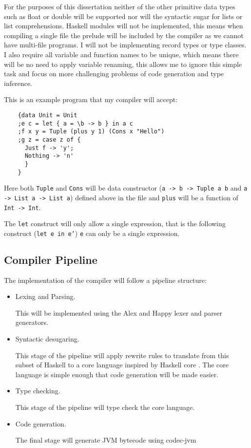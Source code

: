 \documentclass[12pt,a4paper,twoside]{article}
\begin{document}
  For the purposes of this dissertation neither of the other primitive data types such as float or double will be supported nor will the syntactic sugar for lists
  or list comprehensions.
  Haskell modules will not be implemented, this means when compiling a single file the prelude will be included by the compiler as we cannot have multi-file programs.
  I will not be implementing record types or type classes. I also require all variable and function names to be unique, which means there will be no need to apply
  variable renaming, this allows me to ignore this simple task and focus on more challenging problems of code generation and type inference.

  This is an example program that my compiler will accept:

  \begin{verbatim}
    {data Unit = Unit
    ;e c = let { a = \b -> b } in a c
    ;f x y = Tuple (plus y 1) (Cons x "Hello")
    ;g z = case z of {
      Just f -> 'y';
      Nothing -> 'n'
      }
    }
  \end{verbatim}

  Here both \texttt{Tuple} and \texttt{Cons} will be data constructor (\texttt{a -> b -> Tuple a b} and \texttt{a -> List a -> List a})
  defined above in the file and \texttt{plus} will be a function of \texttt{Int -> Int}.

  The \texttt{let} construct will only allow a single expression, that is the following construct (\texttt{let e in e'})
  \texttt{e} can only be a single expression.

  \subsection*{Compiler Pipeline}
  The implementation of the compiler will follow a pipeline structure:

  \begin{itemize}
    \item Lexing and Parsing.

      This will be implemented using the Alex and Happy lexer and parser generators.
    \item Syntactic desugaring.

      This stage of the pipeline will apply rewrite rules to translate from this subset of Haskell to a core language inspired by Haskell core \cite{typedcorelink}.
      The core language is simple enough that code generation will be made easier.
    \item Type checking.

     This stage of the pipeline will type check the core language.
    \item Code generation.

     The final stage will generate JVM bytecode using codec-jvm \cite{codec-jvm-link}
  \end{itemize}
\end{document}

